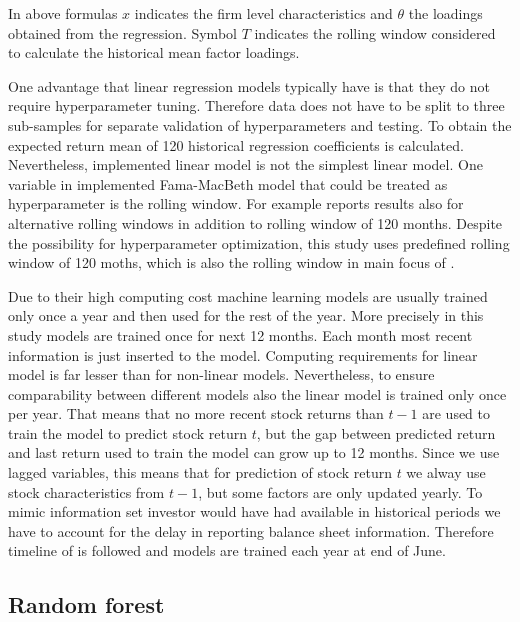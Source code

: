 \documentclass[12pt]{article}
\begin{document}
In above formulas $x$ indicates the firm level characteristics and $\theta$ the loadings obtained from the regression. Symbol $T$ indicates the rolling window considered to calculate the historical mean factor loadings. \par

One advantage that linear regression models typically have is that they do not require hyperparameter tuning. Therefore data  does not have to be split to three sub-samples for separate validation of hyperparameters and testing. To obtain the expected return mean of 120 historical regression coefficients is calculated. Nevertheless, implemented linear model is not the simplest linear model. One variable in implemented Fama-MacBeth model that could be treated as hyperparameter is the rolling window. For example \citet{Lewellen2015} reports results also for alternative rolling windows in addition to rolling window of 120 months. Despite the possibility for hyperparameter optimization, this study uses predefined rolling window of 120 moths, which is also the rolling window in main focus of \citet{Lewellen2015}. \par

Due to their high computing cost machine learning models are usually trained only once a year and then used for the rest of the year. More precisely in this study models are trained once for next 12 months. Each month most recent information is just inserted to the model. Computing requirements for linear model is far lesser than for non-linear models. Nevertheless, to ensure comparability between different models also the linear model is trained only once per year. That means that no more recent stock returns than $t-1$ are used to train the model to predict stock return $t$, but the gap between predicted return and last return used to train the model can grow up to 12 months. Since we use lagged variables, this means that for prediction of stock return $t$ we alway use stock characteristics from $t-1$, but some factors are only updated yearly. To mimic information set investor would have had available in historical periods we have to account for the delay in reporting balance sheet information. Therefore timeline of \citet{FAMA19933} is followed and models are trained each year at end of June. \par

\subsection{Random forest}
\end{document}
